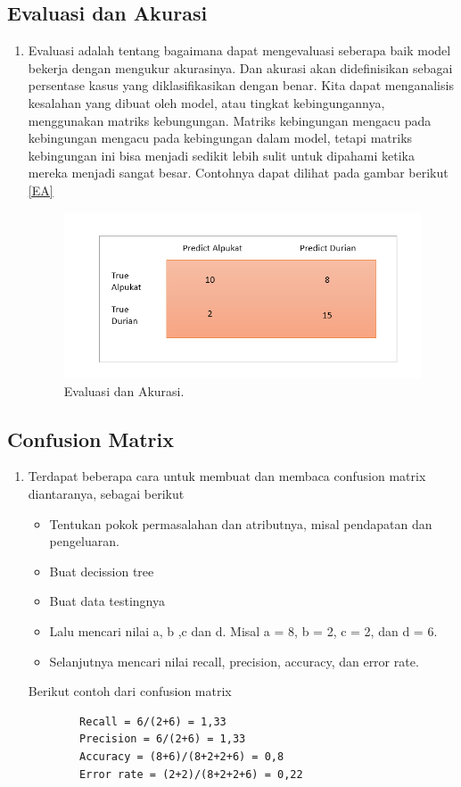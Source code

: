 \subsection{Evaluasi dan Akurasi}
\begin{enumerate}
\item Evaluasi adalah tentang bagaimana dapat mengevaluasi seberapa baik model bekerja dengan mengukur akurasinya. Dan akurasi akan didefinisikan sebagai persentase kasus yang diklasifikasikan dengan benar. Kita dapat menganalisis kesalahan yang dibuat oleh model, atau tingkat kebingungannya, menggunakan matriks kebungungan. Matriks kebingungan mengacu pada kebingungan mengacu pada kebingungan dalam model, tetapi matriks kebingungan ini bisa menjadi sedikit lebih sulit untuk dipahami ketika mereka menjadi sangat besar. Contohnya dapat dilihat pada gambar berikut \ref{EA}
		\begin{figure}[ht]
		\centerline{\includegraphics[width=1\textwidth]{figures/im/im00.png}}
		\caption{Evaluasi dan Akurasi.}
		\label{c}
		\end{figure}
\end{enumerate}

\subsection{Confusion Matrix}
\begin{enumerate}
\item Terdapat beberapa cara untuk membuat dan membaca confusion matrix diantaranya, sebagai berikut
	\begin{itemize}
		\item Tentukan pokok permasalahan dan atributnya, misal pendapatan dan pengeluaran.
		\item Buat decission tree
		\item Buat data testingnya
		\item Lalu mencari nilai a, b ,c dan d. Misal a = 8, b = 2, c = 2, dan d = 6.
		\item Selanjutnya mencari nilai recall, precision, accuracy, dan error rate.
	\end{itemize}
\subitem Berikut contoh dari confusion matrix
	\begin{verbatim}
		Recall = 6/(2+6) = 1,33
		Precision = 6/(2+6) = 1,33
		Accuracy = (8+6)/(8+2+2+6) = 0,8
		Error rate = (2+2)/(8+2+2+6) = 0,22
	\end{verbatim}
\end{enumerate}

